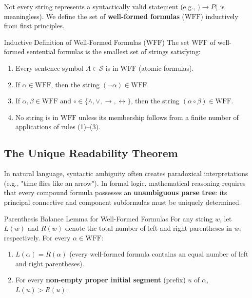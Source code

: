Not every string represents a syntactically valid statement (e.g., $)\to P($ is meaningless). We define the set of \textbf{well-formed formulas} ($\mathrm{WFF}$) inductively from first principles.

\begin{definitionbox}{Inductive Definition of Well-Formed Formulas ($\mathrm{WFF}$)}
The set $\mathrm{WFF}$ of well-formed sentential formulas is the smallest set of strings satisfying:
\begin{enumerate}[leftmargin=1.4em,itemsep=2pt]
  \item Every sentence symbol $A \in \mathcal{S}$ is in $\mathrm{WFF}$ (atomic formulas).
  \item If $\alpha \in \mathrm{WFF}$, then the string $(\neg \alpha) \in \mathrm{WFF}$.
  \item If $\alpha, \beta \in \mathrm{WFF}$ and $\circ \in \{\land, \lor, \to, \leftrightarrow\}$, then the string $(\alpha \circ \beta) \in \mathrm{WFF}$.
  \item No string is in $\mathrm{WFF}$ unless its membership follows from a finite number of applications of rules (1)--(3).
\end{enumerate}
\end{definitionbox}

\subsection{The Unique Readability Theorem}

In natural language, syntactic ambiguity often creates paradoxical interpretations (e.g., "time flies like an arrow"). In formal logic, mathematical reasoning requires that every compound formula possesses an \textbf{unambiguous parse tree}: its principal connective and component subformulas must be uniquely determined.

\begin{propbox}{Parenthesis Balance Lemma for Well-Formed Formulas}
For any string $w$, let $L(w)$ and $R(w)$ denote the total number of left and right parentheses in $w$, respectively. For every $\alpha \in \mathrm{WFF}$:
\begin{enumerate}[leftmargin=1.4em,itemsep=2pt]
  \item $L(\alpha) = R(\alpha)$ (every well-formed formula contains an equal number of left and right parentheses).
  \item For every \textbf{non-empty proper initial segment} (prefix) $u$ of $\alpha$, $L(u) > R(u)$.
\end{enumerate}
\end{propbox}

